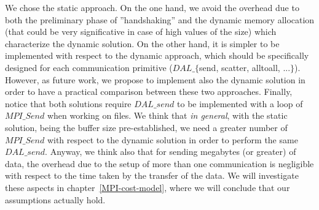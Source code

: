 We chose the static approach. On the one hand, we avoid the overhead due to both the preliminary phase of ''handshaking'' and the dynamic memory allocation (that could be very significative in case of high values of the size) which characterize the dynamic solution. On the other hand, it is simpler to be implemented with respect to the dynamic approach, which should be specifically designed for each communication primitive ($DAL\_\lbrace$send, scatter, alltoall, ...$\rbrace$). However, as future work, we propose to implement also the dynamic solution in order to have a practical comparison between these two approaches. Finally, notice that both solutions require $DAL\_send$ to be implemented with a loop of $MPI\_Send$ when working on files. We think that \textit{in general}, with the static solution, being the buffer size pre-established, we need a greater number of $MPI\_Send$ with respect to the dynamic solution in order to perform the same $DAL\_send$. Anyway, we think also that for sending megabytes (or greater) of data, the overhead due to the setup of more than one communication is negligible with respect to the time taken by the transfer of the data. We will investigate these aspects in chapter~\ref{MPI-cost-model}, where we will conclude that our assumptions actually hold.

